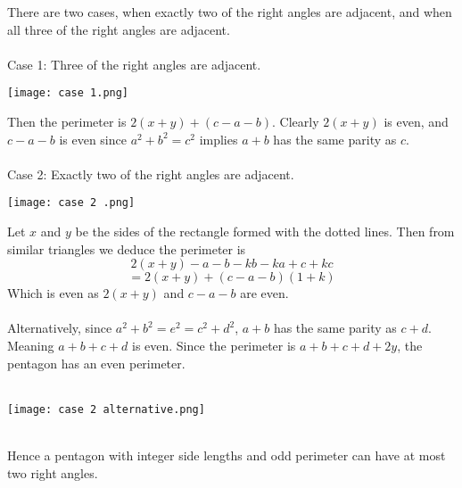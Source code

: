 \documentclass{article}
\begin{document}
There are two cases, when exactly two of the right angles are adjacent, and when all three of the right angles are adjacent. \\\\ Case 1: Three of the right angles are adjacent. \\
\centerline{\texttt{[image: case 1.png]}} Then the perimeter is $2(x+y)+(c-a-b)$. Clearly $2(x+y)$ is even, and $c-a-b$ is even since $a^2+b^2=c^2$ implies $a+b$ has the same parity as $c$. \\\\
Case 2: Exactly two of the right angles are adjacent. \\ \centerline{\texttt{[image: case 2 .png]}}
Let $x$ and $y$ be the sides of the rectangle formed with the dotted lines. Then from similar triangles we deduce the perimeter is $$2(x+y)-a-b-kb-ka+c+kc$$ $$= 2(x+y)+(c-a-b)(1+k)$$ Which is even as $2(x+y)$ and $c-a-b$ are even. \\\\ Alternatively, since $a^2+b^2=e^2=c^2+d^2$, $a+b$ has the same parity as $c+d$. Meaning $a+b+c+d$ is even. Since the perimeter is $a+b+c+d+2y$, the pentagon has an even perimeter. \\\\
\centerline{\texttt{[image: case 2 alternative.png]}}
\\ Hence a pentagon with integer side lengths and odd perimeter can have at most two right angles.
\end{document}
